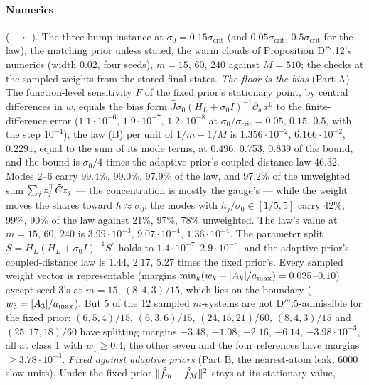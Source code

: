 \paragraph{Numerics} ( $\to$ ). The three-bump
instance at $\sigma_0 = 0.15\sigma_{\mathrm{crit}}$ (and $0.05\sigma_{\mathrm{crit}}$, $0.5\sigma_{\mathrm{crit}}$ for
the law), the matching prior unless stated, the warm clouds of Proposition D$'''$.12's numerics (width 0.02, four
seeds), $m = 15$, $60$, $240$ against $M = 510$; the checks at the sampled weights from the stored final states.
\emph{The floor is the bias} (Part A). The function-level sensitivity $F$ of the fixed prior's stationary point, by
central differences in $w$, equals the bias form $\hat J\sigma_0(H_L + \sigma_0I)^{-1}\partial_wx^0$ to the
finite-difference error ($1.1\cdot10^{-6}$, $1.9\cdot10^{-7}$, $1.2\cdot10^{-8}$ at
$\sigma_0/\sigma_{\mathrm{crit}} = 0.05$, $0.15$, $0.5$, with the step $10^{-4}$); the law (B) per unit of
$1/m - 1/M$ is $1.356\cdot10^{-2}$, $6.166\cdot10^{-2}$, $0.2291$, equal to the sum of its mode terms, at 0.496, 0.753,
0.839 of the bound, and the bound is $\sigma_0/4$ times the adaptive prior's coupled-distance law 46.32. Modes 2--6
carry 99.4\%, 99.0\%, 97.9\% of the law, and 97.2\% of the unweighted sum $\sum_jz_j^\top\tilde Cz_j$ --- the
concentration is mostly the gauge's --- while the weight moves the shares toward $h\approx\sigma_0$: the modes with
$h_j/\sigma_0\in[1/5,5]$ carry 42\%, 99\%, 90\% of the law against 21\%, 97\%, 78\% unweighted. The law's value at
$m = 15$, $60$, $240$ is $3.99\cdot10^{-3}$, $9.07\cdot10^{-4}$, $1.36\cdot10^{-4}$. The parameter split
$S = H_L(H_L + \sigma_0I)^{-1}S^e$ holds to $1.4\cdot10^{-7}$--$2.9\cdot10^{-8}$, and the adaptive prior's
coupled-distance law is 1.44, 2.17, 5.27 times the fixed prior's. Every sampled weight vector is representable
(margins $\min_k(w_k - \lvert A_k\rvert/a_{\max}) = 0.025$--$0.10$) except seed 3's at $m = 15$, $(8,4,3)/15$, which lies on
the boundary ($w_3 = \lvert A_3\rvert/a_{\max}$). But 5 of the 12 sampled $m$-systems are not D$'''$.5-admissible for the
fixed prior: $(6,5,4)/15$, $(6,3,6)/15$, $(24,15,21)/60$, $(8,4,3)/15$ and $(25,17,18)/60$ have splitting margins
$-3.48$, $-1.08$, $-2.16$, $-6.14$, $-3.98\cdot10^{-3}$, all at class 1 with $w_1\ge0.4$; the other seven and the four
references have margins $\ge3.78\cdot10^{-3}$. \emph{Fixed against adaptive priors} (Part B, the nearest-atom leak,
6000 slow units). Under the fixed prior $\lVert \hat f_m - \hat f_M\rVert^2$ stays at its stationary value,

